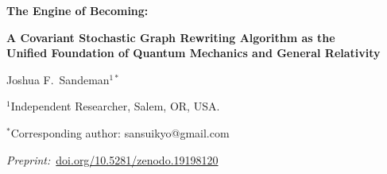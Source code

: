 \documentclass[11pt,a4paper]{article}
\theoremstyle{plain}
\theoremstyle{definition}
\theoremstyle{remark}
\begin{document}
\begin{center}
  {\LARGE\bfseries The Engine of Becoming:\par}
  \vspace{6pt}
  {\large\bfseries A Covariant Stochastic Graph Rewriting Algorithm as the\\
   Unified Foundation of Quantum Mechanics and General Relativity\par}
  \vspace{14pt}
  {\large Joshua F.\ Sandeman$^{1*}$\par}
  \vspace{4pt}
  {\normalsize $^{1}$Independent Researcher, Salem, OR, USA.\par}
  {\normalsize $^{*}$Corresponding author: sansuikyo@gmail.com\par}
  \vspace{8pt}
  {\small\textit{Preprint:}~\href{https://doi.org/10.5281/zenodo.19198120}
    {doi.org/10.5281/zenodo.19198120}\par}
  \vspace{14pt}
\end{center}
\end{document}
